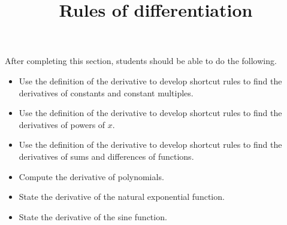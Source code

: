 \documentclass{ximera}
\title{Rules of differentiation}
\begin{document}
\begin{abstract}
\end{abstract}

\maketitle

\begin{sectionOutcomes}

After completing this section, students should be able to do the following.

\begin{itemize}
	\item Use the definition of the derivative to develop shortcut rules to find the derivatives of constants and constant multiples.
	\item Use the definition of the derivative to develop shortcut rules to find the derivatives of powers of $x$.
	\item Use the definition of the derivative to develop shortcut rules to find the derivatives of sums and differences of functions.
        \item Compute the derivative of polynomials.
        \item State the derivative of the natural exponential function.
	\item State the derivative of the sine function.
\end{itemize}

\end{sectionOutcomes}
\end{document}
